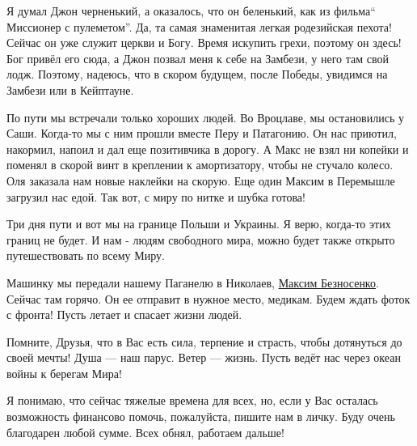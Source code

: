 Я думал Джон черненький, а оказалось, что он беленький, как из фильма\enquote{
Миссионер с пулеметом}. Да, та самая знаменитая легкая родезийская пехота!
Сейчас он уже служит церкви и Богу. Время искупить грехи, поэтому он здесь!
Бог привёл его сюда, а Джон позвал меня к себе на Замбези, у него там свой
лодж. Поэтому, надеюсь, что в скором будущем, после Победы, увидимся на Замбези
или в Кейптауне.

По пути мы встречали только хороших людей. Во Вроцлаве, мы остановились у Саши.
Когда-то мы с ним прошли вместе Перу и Патагонию. Он нас приютил, накормил,
напоил и дал еще позитивчика в дорогу.  А Макс не взял ни копейки и поменял в
скорой винт в креплении к амортизатору, чтобы не стучало колесо. Оля заказала
нам новые наклейки на скорую. Еще один Максим в Перемышле загрузил нас едой.
Так вот, с миру по нитке и шубка готова!

Три дня пути и вот мы на границе Польши и Украины. Я верю, когда-то этих границ
не будет. И нам - людям свободного мира, можно будет также открыто
путешествовать по всему Миру.  

Машинку мы передали нашему Паганелю в Николаев,
\href{https://www.facebook.com/maxim.beznosenko}{Максим Безносенко}. Сейчас там
горячо. Он ее отправит в нужное место, медикам. Будем ждать фоток с фронта!
Пусть летает и спасает жизни людей.

Помните, Друзья, что в Вас есть сила, терпение и страсть, чтобы дотянуться до
своей мечты!  Душа — наш парус. Ветер — жизнь. Пусть ведёт нас через океан
войны к берегам Мира! 

Я понимаю,  что сейчас тяжелые времена для всех, но, если у Вас осталась
возможность финансово помочь, пожалуйста, пишите нам в личку. Буду очень
благодарен любой сумме. Всех обнял, работаем дальше!
